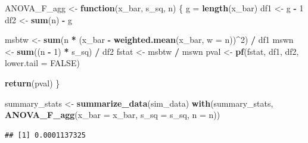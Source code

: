 \documentclass[
]{book}
\newenvironment{Shaded}{\begin{snugshade}}{\end{snugshade}}
\newcommand{\AttributeTok}[1]{\textcolor[rgb]{0.13,0.29,0.53}{#1}}
\newcommand{\ConstantTok}[1]{\textcolor[rgb]{0.56,0.35,0.01}{#1}}
\newcommand{\ControlFlowTok}[1]{\textcolor[rgb]{0.13,0.29,0.53}{\textbf{#1}}}
\newcommand{\DecValTok}[1]{\textcolor[rgb]{0.00,0.00,0.81}{#1}}
\newcommand{\FunctionTok}[1]{\textcolor[rgb]{0.13,0.29,0.53}{\textbf{#1}}}
\newcommand{\NormalTok}[1]{#1}
\newcommand{\OtherTok}[1]{\textcolor[rgb]{0.56,0.35,0.01}{#1}}
\newcommand{\SpecialCharTok}[1]{\textcolor[rgb]{0.81,0.36,0.00}{\textbf{#1}}}
\begin{document}
\begin{Shaded}
\begin{Highlighting}[]
\NormalTok{ANOVA\_F\_agg }\OtherTok{\textless{}{-}} \ControlFlowTok{function}\NormalTok{(x\_bar, s\_sq, n) \{}
\NormalTok{  g }\OtherTok{=} \FunctionTok{length}\NormalTok{(x\_bar)}
\NormalTok{  df1 }\OtherTok{\textless{}{-}}\NormalTok{ g }\SpecialCharTok{{-}} \DecValTok{1}
\NormalTok{  df2 }\OtherTok{\textless{}{-}} \FunctionTok{sum}\NormalTok{(n) }\SpecialCharTok{{-}}\NormalTok{ g}
  
\NormalTok{  msbtw }\OtherTok{\textless{}{-}} \FunctionTok{sum}\NormalTok{(n }\SpecialCharTok{*}\NormalTok{ (x\_bar }\SpecialCharTok{{-}} \FunctionTok{weighted.mean}\NormalTok{(x\_bar, }\AttributeTok{w =}\NormalTok{ n))}\SpecialCharTok{\^{}}\DecValTok{2}\NormalTok{) }\SpecialCharTok{/}\NormalTok{ df1}
\NormalTok{  mswn }\OtherTok{\textless{}{-}} \FunctionTok{sum}\NormalTok{((n }\SpecialCharTok{{-}} \DecValTok{1}\NormalTok{) }\SpecialCharTok{*}\NormalTok{ s\_sq) }\SpecialCharTok{/}\NormalTok{ df2}
\NormalTok{  fstat }\OtherTok{\textless{}{-}}\NormalTok{ msbtw }\SpecialCharTok{/}\NormalTok{ mswn}
\NormalTok{  pval }\OtherTok{\textless{}{-}} \FunctionTok{pf}\NormalTok{(fstat, df1, df2, }\AttributeTok{lower.tail =} \ConstantTok{FALSE}\NormalTok{)}
 
  \FunctionTok{return}\NormalTok{(pval)}
\NormalTok{\}}

\NormalTok{summary\_stats }\OtherTok{\textless{}{-}} \FunctionTok{summarize\_data}\NormalTok{(sim\_data)}
\FunctionTok{with}\NormalTok{(summary\_stats, }\FunctionTok{ANOVA\_F\_agg}\NormalTok{(}\AttributeTok{x\_bar =}\NormalTok{ x\_bar, }\AttributeTok{s\_sq =}\NormalTok{ s\_sq, }\AttributeTok{n =}\NormalTok{ n))}
\end{Highlighting}
\end{Shaded}

\begin{verbatim}
## [1] 0.0001137325
\end{verbatim}
\end{document}

